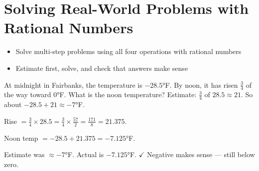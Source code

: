 \section{Solving Real-World Problems with Rational Numbers}

\begin{stepGoal}
\begin{itemize}
    \item Solve multi-step problems using all four operations with rational numbers
    \item Estimate first, solve, and check that answers make sense
\end{itemize}
\end{stepGoal}

\begin{stepVocabBox}
\end{stepVocabBox}

\begin{stepsCard}
\end{stepsCard}

\begin{stepExample}{At midnight in Fairbanks, the temperature is $-28.5°$F. By noon, it has risen $\frac{3}{4}$ of the way toward $0°$F. What is the noon temperature?}
     Estimate: $\frac{3}{4}$ of $28.5 \approx 21$. So about $-28.5 + 21 \approx -7°$F.

     Rise $= \frac{3}{4} \times 28.5 = \frac{3}{4} \times \frac{57}{2} = \frac{171}{8} = 21.375$.\par
    Noon temp $= -28.5 + 21.375 = -7.125°$F.

     Estimate was $\approx -7°$F. Actual is $-7.125°$F. $\checkmark$ Negative makes sense — still below zero.
\end{stepExample}

